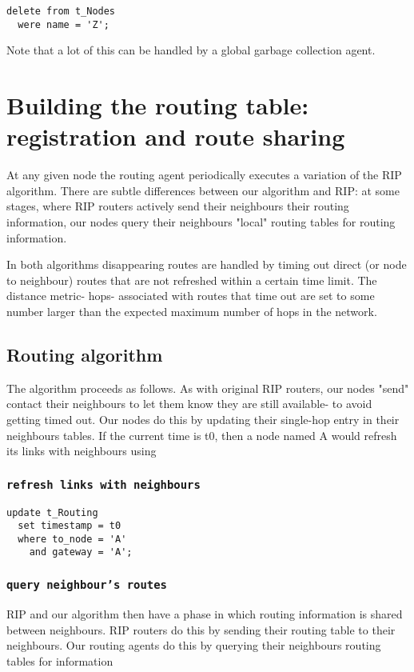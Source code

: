 \documentclass{cmspaper}
\begin{document}
{\small\begin{verbatim}
delete from t_Nodes
  were name = 'Z';
\end{verbatim}}

Note that a lot of this can be handled by a global garbage collection agent.

\section{Building the routing table: registration and route sharing}
At any given node the routing agent periodically executes a variation of the RIP algorithm. There are subtle differences between our algorithm and RIP: at some stages, where RIP routers actively send their neighbours their routing information, our nodes query their neighbours "local" routing tables for routing information.

In both algorithms disappearing routes are handled by timing out direct (or node to neighbour) routes that are not refreshed within a certain time limit. The distance metric- hops- associated with routes that time out are set to some number larger than the expected maximum number of hops in the network.

\subsection{Routing algorithm}
The algorithm proceeds as follows. As with original RIP routers, our nodes "send" contact their neighbours to let them know they are still available- to avoid getting timed out. Our nodes do this by updating their single-hop entry in their neighbours tables. If the current time is t0, then a node named A would refresh its links with neighbours using

\subsubsection{\textbf{\texttt{refresh links with neighbours}}}

{\small\begin{verbatim}
update t_Routing
  set timestamp = t0
  where to_node = 'A'
    and gateway = 'A';
\end{verbatim}}

\subsubsection{\textbf{\texttt{query neighbour's routes}}}
RIP and our algorithm then have a phase in which routing information is shared between neighbours. RIP routers do this by sending their routing table to their neighbours. Our routing agents do this by querying their neighbours routing tables for information
\end{document}
